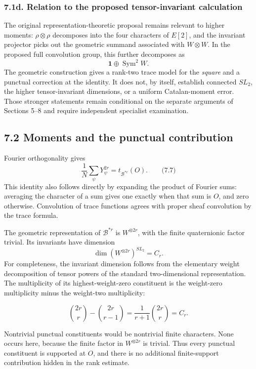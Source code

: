 \documentclass[
  11pt,
  a4paper,
]{article}
\begin{document}
\subsubsection{7.1d. Relation to the proposed tensor-invariant calculation}
The original representation-theoretic proposal remains relevant to
higher moments: \(\rho\otimes\rho\) decomposes into the four
characters of \(E[2]\), and the invariant projector picks out the
geometric summand associated with \(W\otimes W\). In the proposed
full convolution group, this further decomposes as
\[
\mathbf1\oplus\operatorname{Sym}^2W.
\tag{N.9}
\]
The geometric construction gives a rank-two trace model for the
\emph{square} and a punctual correction at the identity. It does not,
by itself, establish connected \(SL_2\), the higher tensor-invariant
dimensions, or a uniform Catalan-moment error. Those stronger
statements remain conditional on the separate arguments of Sections
5--8 and require independent specialist examination.
\subsection{7.2 Moments and the punctual
contribution}\label{moments-and-the-punctual-contribution}

Fourier orthogonality gives \[
\frac1N\sum_\psi Y_\psi^{2r}
=t_{\mathcal B^{*r}}(O).
\qquad \text{(7.7)}
\] This identity also follows directly by expanding the product of
Fourier sums: averaging the character of a sum gives one exactly when
that sum is \(O\), and zero otherwise. Convolution of trace functions
agrees with proper sheaf convolution by the trace formula.

The geometric representation of \(\mathcal B^{*r}\) is
\(W^{\otimes2r}\), with the finite quaternionic factor trivial. Its
invariants have dimension \[
\dim(W^{\otimes2r})^{SL_2}=C_r.
\] For completeness, the invariant dimension follows from the elementary
weight decomposition of tensor powers of the standard two-dimensional
representation. The multiplicity of its highest-weight-zero constituent
is the weight-zero multiplicity minus the weight-two multiplicity:

\[
\binom{2r}{r}-\binom{2r}{r-1}
=\frac{1}{r+1}\binom{2r}{r}=C_r.
\]

Nontrivial punctual constituents would be nontrivial finite characters.
None occurs here, because the finite factor in \(W^{\otimes2r}\) is
trivial. Thus every punctual constituent is supported at \(O\), and
there is no additional finite-support contribution hidden in the rank
estimate.
\end{document}
